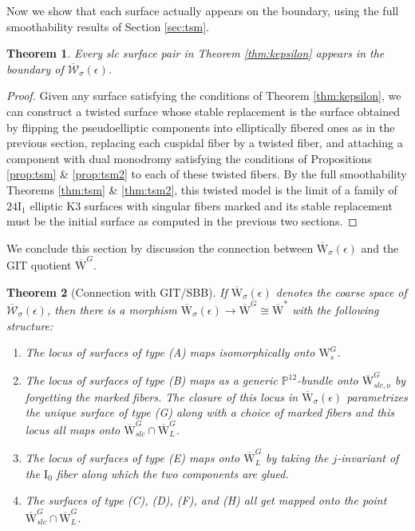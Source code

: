 \documentclass[11pt]{amsart}
\newtheorem{theorem}{Theorem}[section]
\theoremstyle{definition}
\theoremstyle{remark}
\newcommand{\mb}[1]{\mathbb{#1}}
\newcommand{\oMG}{\overline{\mathrm{W}}^G}
\newcommand{\MG}{{\mathrm{W}}^G}
\newcommand{\sbb}{\overline{\mathrm{W}}^{*}}
\newcommand{\kepsilon}{\overline{\mathcal{W}}_\sigma(\epsilon)}
\newcommand{\kepsiloncoarse}{{\overline{\mathrm{W}}}_\sigma(\epsilon)}
\begin{document}
	Now we show that each surface actually appears on the boundary, using the full smoothability results of Section \ref{sec:tsm}.
	
	\begin{theorem}\label{thm:appear}  Every slc surface pair in Theorem \ref{thm:kepsilon} appears in the boundary of $\kepsilon$.
	\end{theorem}
	\begin{proof} Given any surface satisfying the conditions of Theorem \ref{thm:kepsilon}, we can construct a twisted surface whose stable replacement is the surface obtained by flipping the pseudoelliptic components into elliptically fibered ones as in the previous section, replacing each cuspidal fiber by a twisted fiber, and attaching a component with dual monodromy satisfying the conditions of Propositions \ref{prop:tsm} \& \ref{prop:tsm2} to each of these twisted fibers. By the full smoothability Theorems \ref{thm:tsm} \& \ref{thm:tsm2}, this twisted model is the limit of a family of $24\mathrm{I}_1$ elliptic K3 surfaces with singular fibers marked and its stable replacement must be the initial surface as computed in the previous two sections. 
	\end{proof} 
	
	We conclude this section by discussion the connection between $\kepsiloncoarse$ and the GIT quotient $\oMG$.
	
	\begin{theorem}[Connection with GIT/SBB]\label{thm:git2}
		If $\kepsiloncoarse$ denotes the coarse space of $\kepsilon$, then there is a morphism $\kepsiloncoarse \to \oMG \cong \sbb$ with the following structure:
		\begin{enumerate}
			\item The locus of surfaces of type (A) maps isomorphically onto $\MG_s$.
			
			\item The locus of surfaces of type (B) maps as a generic $\mb{P}^{12}$-bundle onto $\oMG_{slc,o}$ by forgetting the marked fibers. The closure of this locus in $\kepsiloncoarse$ parametrizes the unique surface of type (G) along with a choice of marked fibers and this locus all maps onto $\oMG_{slc} \cap \oMG_L$.
			
			\item The locus of surfaces of type (E) maps onto $\oMG_L$ by taking the $j$-invariant of the $\mathrm{I}_0$ fiber along which the two components are glued. 
			
			\item The surfaces of type (C), (D), (F), and (H) all get mapped onto the point $\oMG_{slc} \cap \oMG_L$. 
			
		\end{enumerate}
	\end{theorem}
	
\end{document}
